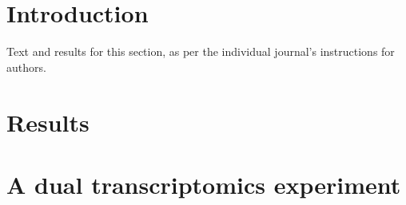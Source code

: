\documentclass{bmcart}
\begin{document}



\section*{Introduction}
Text and results for this section, as per the individual journal's instructions for authors. 


  \section*{Results}


 \section*{A dual transcriptomics experiment}
\end{document}
